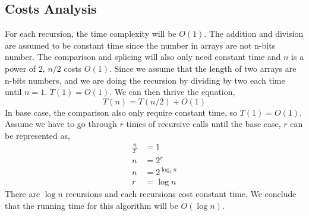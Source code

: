 \documentclass{article}
\begin{document}
    \subsection*{Costs Analysis}
    For each recursion, the time complexity will be $O(1)$. The addition and division are assumed to be constant time since the number in arrays are not n-bits number. The comparison and splicing
    will also only need constant time and $n$ is a power of 2, $n/2$ costs $O(1)$. Since we assume that the length of two arrays are n-bits numbers, and we are doing the recursion by dividing by two each time until $n=1$.
    $T(1) = O(1)$. We can then thrive the equation,
    $$T(n) = T(n/2) + O(1)$$
    In base case, the comparison also only require constant time, so $T(1) = O(1)$. Assume we have to go through $r$ times of recursive calls until the base case, $r$ can 
    be represented as,
    \begin{align}
        \frac{n}{2^r} &= 1 \nonumber \\
        n &= 2^r  \nonumber \\
        n &= 2^{\log_2 n} \nonumber \\
        r &= \log n \nonumber
    \end{align}
    There are $\log n$ recursions and each recursions cost constant time. We conclude that the running time for this algorithm will be $O(\log n)$.
    
\end{document}
